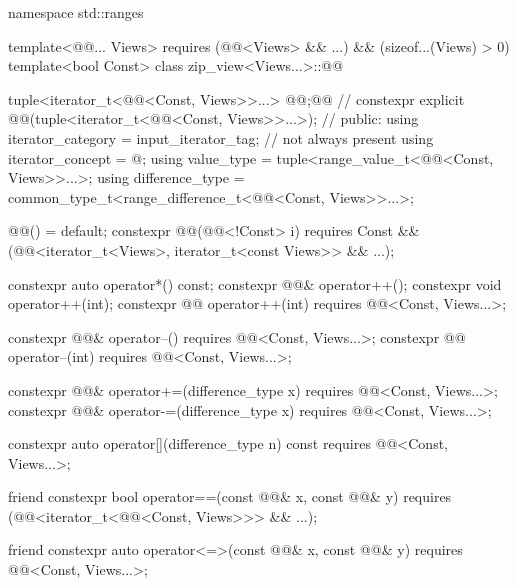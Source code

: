 \begin{codeblock}
namespace std::ranges {
  template<@@... Views>
    requires (@@<Views> && ...) && (sizeof...(Views) > 0)
  template<bool Const>
  class zip_view<Views...>::@@ {
    tuple<iterator_t<@@<Const, Views>>...> @@;@\itcorr[-1]@       // \expos
    constexpr explicit @@(tuple<iterator_t<@@<Const, Views>>...>);
                                                                            // \expos
  public:
    using iterator_category = input_iterator_tag;                           // not always present
    using iterator_concept  = @\seebelow@;
    using value_type = tuple<range_value_t<@@<Const, Views>>...>;
    using difference_type = common_type_t<range_difference_t<@@<Const, Views>>...>;

    @@() = default;
    constexpr @@(@@<!Const> i)
      requires Const && (@@<iterator_t<Views>, iterator_t<const Views>> && ...);

    constexpr auto operator*() const;
    constexpr @@& operator++();
    constexpr void operator++(int);
    constexpr @@ operator++(int) requires @@<Const, Views...>;

    constexpr @@& operator--() requires @@<Const, Views...>;
    constexpr @@ operator--(int) requires @@<Const, Views...>;

    constexpr @@& operator+=(difference_type x)
      requires @@<Const, Views...>;
    constexpr @@& operator-=(difference_type x)
      requires @@<Const, Views...>;

    constexpr auto operator[](difference_type n) const
      requires @@<Const, Views...>;

    friend constexpr bool operator==(const @@& x, const @@& y)
      requires (@@<iterator_t<@@<Const, Views>>> && ...);

    friend constexpr auto operator<=>(const @@& x, const @@& y)
      requires @@<Const, Views...>;

}}
\end{codeblock}
